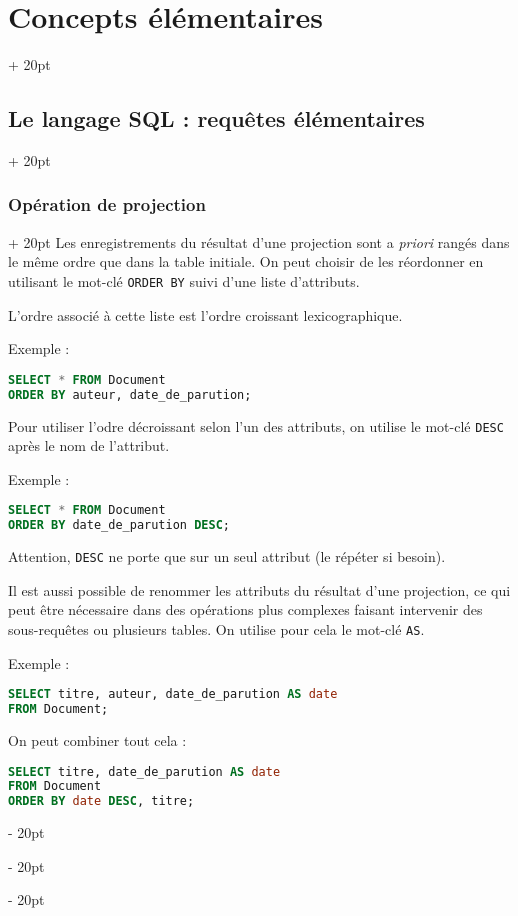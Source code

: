 \documentclass[a4paper, 12pt, twoside]{article}
\newcommand{\ind}[1][20pt]{\advance\leftskip + #1}
\newcommand{\deind}[1][20pt]{\advance\leftskip - #1}
\newenvironment{indt}[2][20pt]{#2 \par \ind[#1]}{\par \deind} %
\begin{document}
\begin{indt}{\section{Concepts élémentaires}}
\begin{indt}{\subsection{Le langage SQL : requêtes élémentaires}}
\begin{indt}{\subsubsection{Opération de projection}}
               Les enregistrements du résultat d'une projection sont a \textit{priori} rangés dans le même ordre que dans la table initiale. On peut choisir de les réordonner en utilisant le mot-clé \texttt{ORDER BY} suivi d'une liste d'attributs.
               
               L'ordre associé à cette liste est l'ordre croissant lexicographique.
               
               Exemple :
               
                \begin{lstlisting}[language=SQL, xleftmargin=80pt]
SELECT * FROM Document
ORDER BY auteur, date_de_parution;\end{lstlisting}
                
                Pour utiliser l'odre décroissant selon l'un des attributs, on utilise le mot-clé \texttt{DESC} après le nom de l'attribut.
                
                Exemple :
                
                \begin{lstlisting}[language=SQL, xleftmargin=80pt]
SELECT * FROM Document
ORDER BY date_de_parution DESC;\end{lstlisting}
                
                Attention, \texttt{DESC} ne porte que sur un seul attribut (le répéter si besoin).
                
                \vspace{12pt}
                
                Il est aussi possible de renommer les attributs du résultat d'une projection, ce qui peut être nécessaire dans des opérations plus complexes faisant intervenir des sous-requêtes ou plusieurs tables. On utilise pour cela le mot-clé \texttt{AS}.
                
                Exemple :
                
                \begin{lstlisting}[language=SQL, xleftmargin=80pt]
SELECT titre, auteur, date_de_parution AS date
FROM Document;\end{lstlisting}
                
                On peut combiner tout cela :
                
                \begin{lstlisting}[language=SQL, xleftmargin=80pt]
SELECT titre, date_de_parution AS date
FROM Document
ORDER BY date DESC, titre;\end{lstlisting}
            \end{indt}
        \end{indt}
        
    \end{indt}
    
    
    
\end{document}
